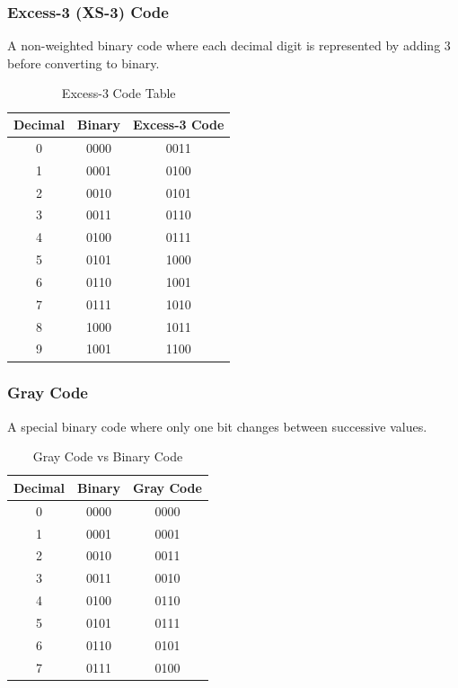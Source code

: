 \documentclass[a4paper,12pt]{article}
\begin{document}
\subsubsection{Excess-3 (XS-3) Code}
A non-weighted binary code where each decimal digit is represented by adding 3 before converting to binary.

\begin{table}[h]
    \centering
    \begin{tabular}{|c|c|c|}
        \hline
        \textbf{Decimal} & \textbf{Binary} & \textbf{Excess-3 Code} \\
        \hline
        0 & 0000 & 0011 \\
        1 & 0001 & 0100 \\
        2 & 0010 & 0101 \\
        3 & 0011 & 0110 \\
        4 & 0100 & 0111 \\
        5 & 0101 & 1000 \\
        6 & 0110 & 1001 \\
        7 & 0111 & 1010 \\
        8 & 1000 & 1011 \\
        9 & 1001 & 1100 \\
        \hline
    \end{tabular}
    \caption{Excess-3 Code Table}
\end{table}
\newpage
\subsubsection{Gray Code}
A special binary code where only one bit changes between successive values.

\begin{table}[h]
    \centering
    \begin{tabular}{|c|c|c|}
        \hline
        \textbf{Decimal} & \textbf{Binary} & \textbf{Gray Code} \\
        \hline
        0 & 0000 & 0000 \\
        1 & 0001 & 0001 \\
        2 & 0010 & 0011 \\
        3 & 0011 & 0010 \\
        4 & 0100 & 0110 \\
        5 & 0101 & 0111 \\
        6 & 0110 & 0101 \\
        7 & 0111 & 0100 \\
        \hline
    \end{tabular}
    \caption{Gray Code vs Binary Code}
\end{table}
\end{document}
